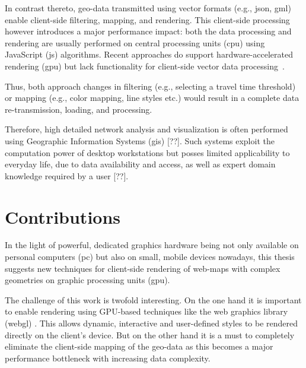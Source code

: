     In contrast thereto, geo-data transmitted using vector formats
    (e.g., \acrshort{json}, \acrshort{gml}) enable
    client-side filtering, mapping, and rendering. This client-side processing
    however introduces a major performance impact: both the data processing and
    rendering are usually performed on central processing units (\acrshort{cpu})
    using JavaScript (\acrshort{js}) algorithms. Recent approaches do support
    hardware-accelerated rendering (\acrshort{gpu}) but lack functionality for
    client-side vector data processing~\cite{Gaffuri2012}.\par

    Thus, both approach changes in filtering (e.g., selecting a travel time
    threshold) or mapping (e.g., color mapping, line styles etc.) would result
    in a complete data re-transmission, loading, and processing.\par

    Therefore, high detailed network analysis and visualization is often
    performed using Geographic Information Systems (\acrshort{gis}) [??]. Such
    systems
    exploit the computation power of desktop workstations but posses limited
    applicability to everyday life, due to data availability and access, as well
    as expert domain knowledge required by a user [??].\par

  \section{Contributions}
    \label{sec:intro:contr}

    In the light of powerful, dedicated graphics hardware being not only
    available on personal computers (\acrshort{pc}) but also
    on small, mobile devices nowadays, this thesis suggests new techniques for
    client-side rendering of web-maps with complex geometries on graphic
    processing units (\acrshort{gpu}).\par

    The challenge of this work is twofold interesting. On the one hand it is
    important to enable rendering using GPU-based techniques like
    the web graphics library (\acrshort{webgl}) \cite{Jackson2016}.
    This allows dynamic, interactive and user-defined styles to be rendered
    directly on the client's device. But on the other hand it is a must to
    completely eliminate the client-side mapping of the geo-data as this becomes
    a major performance bottleneck with increasing data complexity.\par

